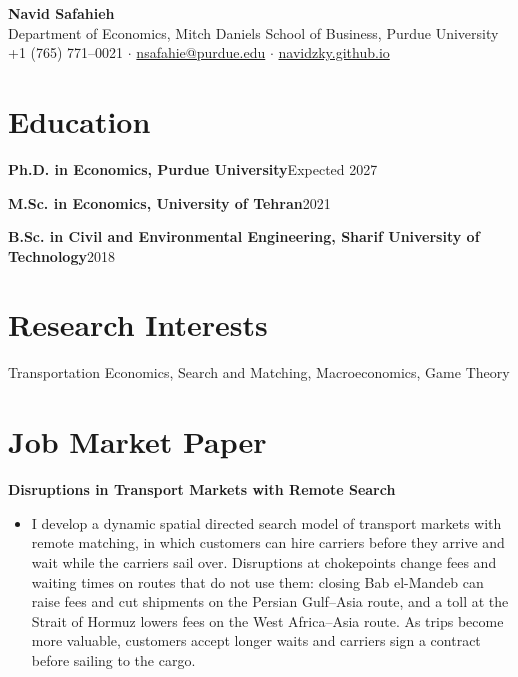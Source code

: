 \documentclass[10pt]{article}
\newcommand{\entry}[2]{%
  \needspace{2\baselineskip}%
  \textbf{#1}\hfill #2\par}
\newcommand{\paper}[1]{\needspace{2\baselineskip}\textbf{#1}\par\vspace{0.1em}}
\newenvironment{desc}
  {\begin{itemize}[leftmargin=1.1em,topsep=0.05em,itemsep=0.05em,parsep=0pt]}
  {\end{itemize}\vspace{0.25em}}
\begin{document}
\begin{center}
  {\Large\bfseries Navid Safahieh}\\[0.35em]
  Department of Economics, Mitch Daniels School of Business, Purdue University\\[0.15em]
  +1 (765) 771--0021 \quad$\cdot$\quad
  \href{mailto:nsafahie@purdue.edu}{nsafahie@purdue.edu} \quad$\cdot$\quad
  \href{https://navidzky.github.io}{navidzky.github.io}
\end{center}

\section{Education}

\entry{Ph.D. in Economics, Purdue University}{Expected 2027}
\entry{M.Sc. in Economics, University of Tehran}{2021}
\entry{B.Sc. in Civil and Environmental Engineering, Sharif University of Technology}{2018}

\section{Research Interests}
Transportation Economics, Search and Matching, Macroeconomics, Game Theory

\section{Job Market Paper}

\paper{Disruptions in Transport Markets with Remote Search}
\begin{desc}
  \item I develop a dynamic spatial directed search model of transport markets with remote matching,
  in which customers can hire carriers before they arrive and wait while the carriers sail over.
  Disruptions at chokepoints change fees and waiting times on routes that do not use them: closing
  Bab el-Mandeb can raise fees and cut shipments on the Persian Gulf--Asia route, and a toll at the
  Strait of Hormuz lowers fees on the West Africa--Asia route. As trips become more valuable,
  customers accept longer waits and carriers sign a contract before sailing to the cargo.
\end{desc}
\end{document}
